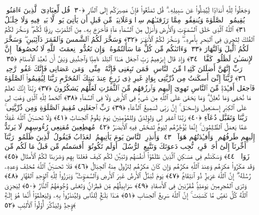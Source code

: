  وَجَعَلُوا۟ لِلَّهِ أَندَادًۭا لِّيُضِلُّوا۟ عَن سَبِيلِهِۦ ۗ قُل تَمَتَّعُوا۟ فَإِنَّ مَصِيرَكُم إِلَى ٱلنَّارِ ﴿٣٠﴾
 قُل لِّعِبَادِىَ ٱلَّذِينَ ءَامَنُوا۟ يُقِيمُوا۟ ٱلصَّلَوٰةَ وَيُنفِقُوا۟ مِمَّا رَزَقنَـٰهُم سِرًّۭا وَعَلَانِيَةًۭ مِّن قَبلِ أَن يَأتِىَ يَومٌۭ لَّا بَيعٌۭ فِيهِ وَلَا خِلَـٰلٌ ﴿٣١﴾
 ٱللَّهُ ٱلَّذِى خَلَقَ ٱلسَّمَـٰوَٟتِ وَٱلأَرضَ وَأَنزَلَ مِنَ ٱلسَّمَآءِ مَآءًۭ فَأَخرَجَ بِهِۦ مِنَ ٱلثَّمَرَٰتِ رِزقًۭا لَّكُم ۖ وَسَخَّرَ لَكُمُ ٱلفُلكَ لِتَجرِىَ فِى ٱلبَحرِ بِأَمرِهِۦ ۖ وَسَخَّرَ لَكُمُ ٱلأَنهَـٰرَ ﴿٣٢﴾
 وَسَخَّرَ لَكُمُ ٱلشَّمسَ وَٱلقَمَرَ دَآئِبَينِ ۖ وَسَخَّرَ لَكُمُ ٱلَّيلَ وَٱلنَّهَارَ ﴿٣٣﴾
 وَءَاتَىٰكُم مِّن كُلِّ مَا سَأَلتُمُوهُ ۚ وَإِن تَعُدُّوا۟ نِعمَتَ ٱللَّهِ لَا تُحصُوهَآ ۗ إِنَّ ٱلإِنسَـٰنَ لَظَلُومٌۭ كَفَّارٌۭ ﴿٣٤﴾
 وَإِذ قَالَ إِبرَٰهِيمُ رَبِّ ٱجعَل هَـٰذَا ٱلبَلَدَ ءَامِنًۭا وَٱجنُبنِى وَبَنِىَّ أَن نَّعبُدَ ٱلأَصنَامَ ﴿٣٥﴾
 رَبِّ إِنَّهُنَّ أَضلَلنَ كَثِيرًۭا مِّنَ ٱلنَّاسِ ۖ فَمَن تَبِعَنِى فَإِنَّهُۥ مِنِّى ۖ وَمَن عَصَانِى فَإِنَّكَ غَفُورٌۭ رَّحِيمٌۭ ﴿٣٦﴾
 رَّبَّنَآ إِنِّىٓ أَسكَنتُ مِن ذُرِّيَّتِى بِوَادٍ غَيرِ ذِى زَرعٍ عِندَ بَيتِكَ ٱلمُحَرَّمِ رَبَّنَا لِيُقِيمُوا۟ ٱلصَّلَوٰةَ فَٱجعَل أَفـِٔدَةًۭ مِّنَ ٱلنَّاسِ تَهوِىٓ إِلَيهِم وَٱرزُقهُم مِّنَ ٱلثَّمَرَٰتِ لَعَلَّهُم يَشكُرُونَ ﴿٣٧﴾
 رَبَّنَآ إِنَّكَ تَعلَمُ مَا نُخفِى وَمَا نُعلِنُ ۗ وَمَا يَخفَىٰ عَلَى ٱللَّهِ مِن شَىءٍۢ فِى ٱلأَرضِ وَلَا فِى ٱلسَّمَآءِ ﴿٣٨﴾
 ٱلحَمدُ لِلَّهِ ٱلَّذِى وَهَبَ لِى عَلَى ٱلكِبَرِ إِسمَـٰعِيلَ وَإِسحَـٰقَ ۚ إِنَّ رَبِّى لَسَمِيعُ ٱلدُّعَآءِ ﴿٣٩﴾
 رَبِّ ٱجعَلنِى مُقِيمَ ٱلصَّلَوٰةِ وَمِن ذُرِّيَّتِى ۚ رَبَّنَا وَتَقَبَّل دُعَآءِ ﴿٤٠﴾
 رَبَّنَا ٱغفِر لِى وَلِوَٟلِدَىَّ وَلِلمُؤمِنِينَ يَومَ يَقُومُ ٱلحِسَابُ ﴿٤١﴾
 وَلَا تَحسَبَنَّ ٱللَّهَ غَٰفِلًا عَمَّا يَعمَلُ ٱلظَّـٰلِمُونَ ۚ إِنَّمَا يُؤَخِّرُهُم لِيَومٍۢ تَشخَصُ فِيهِ ٱلأَبصَـٰرُ ﴿٤٢﴾
 مُهطِعِينَ مُقنِعِى رُءُوسِهِم لَا يَرتَدُّ إِلَيهِم طَرفُهُم ۖ وَأَفـِٔدَتُهُم هَوَآءٌۭ ﴿٤٣﴾
 وَأَنذِرِ ٱلنَّاسَ يَومَ يَأتِيهِمُ ٱلعَذَابُ فَيَقُولُ ٱلَّذِينَ ظَلَمُوا۟ رَبَّنَآ أَخِّرنَآ إِلَىٰٓ أَجَلٍۢ قَرِيبٍۢ نُّجِب دَعوَتَكَ وَنَتَّبِعِ ٱلرُّسُلَ ۗ أَوَلَم تَكُونُوٓا۟ أَقسَمتُم مِّن قَبلُ مَا لَكُم مِّن زَوَالٍۢ ﴿٤٤﴾
 وَسَكَنتُم فِى مَسَـٰكِنِ ٱلَّذِينَ ظَلَمُوٓا۟ أَنفُسَهُم وَتَبَيَّنَ لَكُم كَيفَ فَعَلنَا بِهِم وَضَرَبنَا لَكُمُ ٱلأَمثَالَ ﴿٤٥﴾
 وَقَد مَكَرُوا۟ مَكرَهُم وَعِندَ ٱللَّهِ مَكرُهُم وَإِن كَانَ مَكرُهُم لِتَزُولَ مِنهُ ٱلجِبَالُ ﴿٤٦﴾
 فَلَا تَحسَبَنَّ ٱللَّهَ مُخلِفَ وَعدِهِۦ رُسُلَهُۥٓ ۗ إِنَّ ٱللَّهَ عَزِيزٌۭ ذُو ٱنتِقَامٍۢ ﴿٤٧﴾
 يَومَ تُبَدَّلُ ٱلأَرضُ غَيرَ ٱلأَرضِ وَٱلسَّمَـٰوَٟتُ ۖ وَبَرَزُوا۟ لِلَّهِ ٱلوَٟحِدِ ٱلقَهَّارِ ﴿٤٨﴾
 وَتَرَى ٱلمُجرِمِينَ يَومَئِذٍۢ مُّقَرَّنِينَ فِى ٱلأَصفَادِ ﴿٤٩﴾
 سَرَابِيلُهُم مِّن قَطِرَانٍۢ وَتَغشَىٰ وُجُوهَهُمُ ٱلنَّارُ ﴿٥٠﴾
 لِيَجزِىَ ٱللَّهُ كُلَّ نَفسٍۢ مَّا كَسَبَت ۚ إِنَّ ٱللَّهَ سَرِيعُ ٱلحِسَابِ ﴿٥١﴾
 هَـٰذَا بَلَـٰغٌۭ لِّلنَّاسِ وَلِيُنذَرُوا۟ بِهِۦ وَلِيَعلَمُوٓا۟ أَنَّمَا هُوَ إِلَـٰهٌۭ وَٟحِدٌۭ وَلِيَذَّكَّرَ أُو۟لُوا۟ ٱلأَلبَٰبِ ﴿٥٢﴾
 
